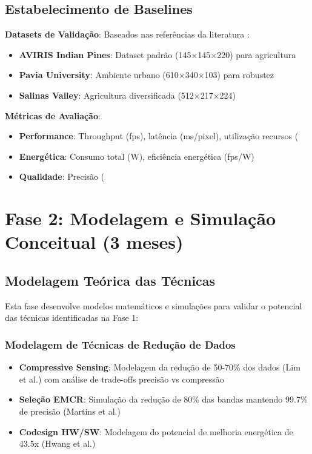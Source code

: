 \subsection{Estabelecimento de Baselines}

\textbf{Datasets de Validação}:
Baseados nas referências da literatura \cite{lou2024, ullah2020}:
\begin{itemize}
\item \textbf{AVIRIS Indian Pines}: Dataset padrão (145×145×220) para agricultura
\item \textbf{Pavia University}: Ambiente urbano (610×340×103) para robustez
\item \textbf{Salinas Valley}: Agricultura diversificada (512×217×224)
\end{itemize}

\textbf{Métricas de Avaliação}:
\begin{itemize}
\item \textbf{Performance}: Throughput (fps), latência (ms/pixel), utilização recursos (%
\item \textbf{Energética}: Consumo total (W), eficiência energética (fps/W)
\item \textbf{Qualidade}: Precisão (%
\end{itemize}

\section{Fase 2: Modelagem e Simulação Conceitual (3 meses)}

\subsection{Modelagem Teórica das Técnicas}

Esta fase desenvolve modelos matemáticos e simulações para validar o potencial das técnicas identificadas na Fase 1:

\subsubsection{Modelagem de Técnicas de Redução de Dados}

\begin{itemize}
\item \textbf{Compressive Sensing}: Modelagem da redução de 50-70\% dos dados (Lim et al.) com análise de trade-offs precisão vs compressão
\item \textbf{Seleção EMCR}: Simulação da redução de 80\% das bandas mantendo 99.7\% de precisão (Martins et al.)
\item \textbf{Codesign HW/SW}: Modelagem do potencial de melhoria energética de 43.5x (Hwang et al.)
\end{itemize}

